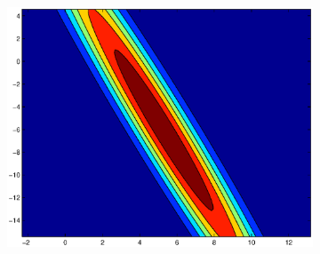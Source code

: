 \documentclass[useAMS,usenatbib,fleqn]{mn2e}
\begin{document}
\begin{figure}
\begin{subfigure}[b]{0.3\columnwidth}
               \includegraphics[width=\textwidth]{figures/GPVC1.eps}
        \end{subfigure}
       

\end{figure}
\end{document}
